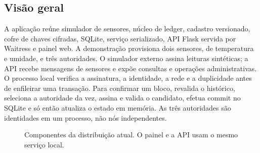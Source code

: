 \documentclass[10pt,a4paper,twocolumn]{article}
\begin{document}
\subsection{Visão geral}
A aplicação reúne simulador de sensores, núcleo de ledger, cadastro versionado, cofre de chaves cifradas, SQLite, serviço serializado, API Flask servida por Waitress e painel web. A demonstração provisiona dois sensores, de temperatura e umidade, e três autoridades. O simulador externo assina leituras sintéticas; a API recebe mensagens de sensores e expõe consultas e operações administrativas. O processo local verifica a assinatura, a identidade, a rede e a duplicidade antes de enfileirar uma transação. Para confirmar um bloco, revalida o histórico, seleciona a autoridade da vez, assina e valida o candidato, efetua commit no SQLite e só então atualiza o estado em memória. As três autoridades são identidades em um processo, não nós independentes.

\begin{figure}[t]
\centering
{}
\caption{Componentes da distribuição atual. O painel e a API usam o mesmo serviço local.}
\label{fig:arquitetura}
\end{figure}
\end{document}
